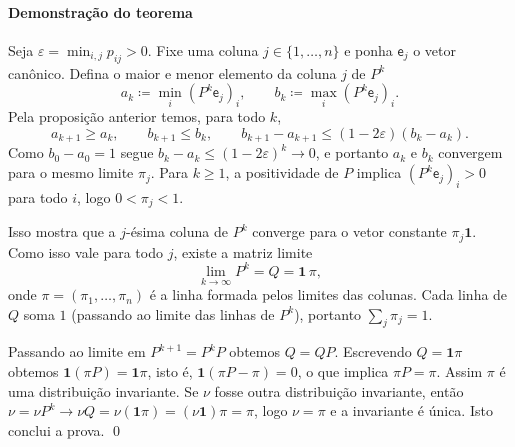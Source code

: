 \documentclass[12pt,letterpaper]{article}
\begin{document}
\paragraph{Demonstração do teorema}
Seja $\varepsilon=\min_{i,j}p_{ij}>0$. Fixe uma coluna
$j\in\{1,\dots,n\}$ e ponha $\mathsf e_j$ o vetor canônico. Defina
o maior e menor elemento da coluna $j$ de $P^k$
\[
a_k \coloneqq \min_i (P^k\mathsf e_j)_i,\qquad
b_k \coloneqq \max_i (P^k\mathsf e_j)_i.
\]
Pela proposição anterior temos, para todo $k$,
\[
a_{k+1}\ge a_k,\qquad b_{k+1}\le b_k,\qquad
b_{k+1}-a_{k+1}\le (1-2\varepsilon)(b_k-a_k).
\]
Como $b_0-a_0=1$ segue $b_k-a_k\le (1-2\varepsilon)^k\to0$, e portanto
$a_k$ e $b_k$ convergem para o mesmo limite $\pi_j$. Para $k\ge1$, a
positividade de $P$ implica $(P^k\mathsf e_j)_i>0$ para todo $i$, logo
$0<\pi_j<1$.

Isso mostra que a $j$-ésima coluna de $P^k$ converge para o vetor
constante $\pi_j\mathbf1$. Como isso vale para todo $j$, existe a matriz
limite
\[
\lim_{k\to\infty}P^k = Q = \mathbf1\,\pi,
\]
onde $\pi=(\pi_1,\dots,\pi_n)$ é a linha formada pelos limites das
colunas. Cada linha de $Q$ soma $1$ (passando ao limite das linhas de
$P^k$), portanto $\sum_j\pi_j=1$.

Passando ao limite em $P^{k+1}=P^kP$ obtemos $Q=QP$. Escrevendo
$Q=\mathbf1\pi$ obtemos $\mathbf1(\pi P)=\mathbf1\pi$, isto é,
$\mathbf1(\pi P-\pi)=0$, o que implica $\pi P=\pi$. Assim $\pi$ é uma
distribuição invariante. Se $\nu$ fosse outra distribuição invariante,
então $\nu=\nu P^k\to\nu Q=\nu(\mathbf1\pi)=(\nu\mathbf1)\pi=\pi$, logo
$\nu=\pi$ e a invariante é única. Isto conclui a prova.  \qed
\end{document}
